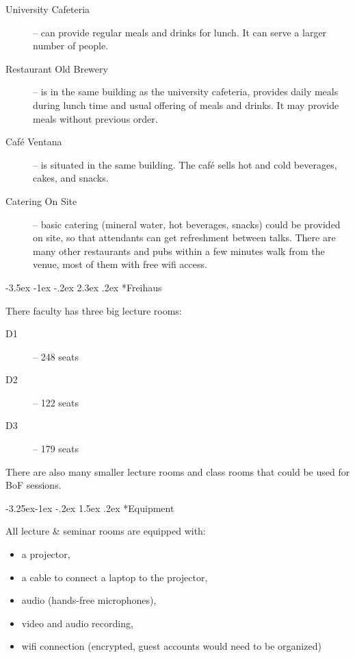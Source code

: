 \documentclass[10pt,a4paper]{article}
\makeatletter
\renewcommand\section{%
\@startsection{section}{1}{\z@}%
              {-3.5ex \@plus -1ex \@minus -.2ex}%
              {2.3ex \@plus.2ex}%
              {\color{kdelight}\sffamily\LARGE\bfseries}}
\renewcommand\subsection{%
\@startsection{subsection}{2}{\z@}%
              {-3.25ex\@plus -1ex \@minus -.2ex}%
              {1.5ex \@plus .2ex}%
              {\color{kdelight}\sffamily\Large\bfseries}}
\makeatother
\begin{document}
\begin{description}
\item[\color{kdedarker} University Cafeteria] -- can provide regular meals and drinks for lunch. It can serve a larger number of people.
\item[\color{kdedarker} Restaurant Old Brewery] -- is in the same building as the university cafeteria, provides daily meals during lunch time and usual offering of meals and drinks. It may provide meals without previous order.
\item[\color{kdedarker} Café Ventana] -- is situated in the same building. The café sells hot and cold beverages, cakes, and snacks.
\item[\color{kdedarker} Catering On Site] -- basic catering (mineral water, hot
beverages, snacks) could be provided on site, so that attendants can get refreshment
between talks. There are many other restaurants and pubs within a few minutes walk
from the venue, most of them with free wifi access.
\end{description}


\section*{Freihaus}


There faculty has three big lecture rooms:
\begin{description}
\item[\color{kdedarker} D1] -- 248 seats
\item[\color{kdedarker} D2] -- 122 seats
\item[\color{kdedarker} D3] -- 179 seats
\end{description}

There are also many smaller lecture rooms and class rooms that could be used for BoF sessions.

\subsection*{Equipment}
All lecture \& seminar rooms are equipped with:
\begin{itemize}
\item a projector,
\item a cable to connect a laptop to the projector,
\item audio (hands-free microphones),
\item video and audio recording,
\item wifi connection (encrypted, guest accounts would need to be organized)
\end{itemize}
\end{document}
